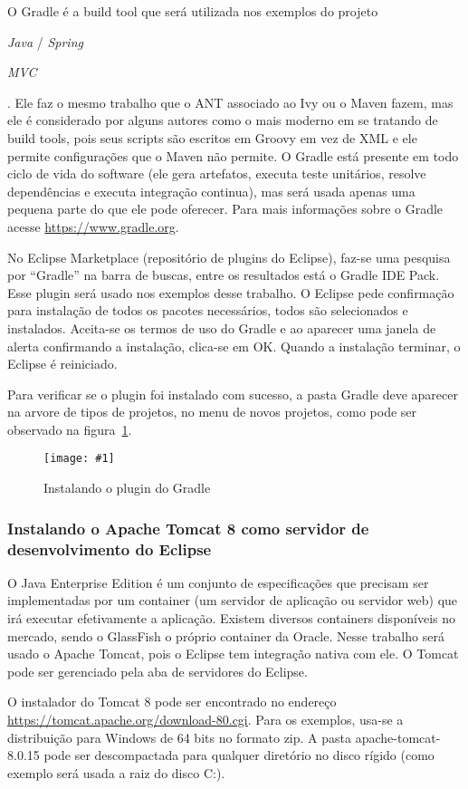 \documentclass[a4paper,12pt]{article}
\newcommand{\spring} {
\lang{Java}/\est{Spring} \sigla{MVC}
}
\newcommand{\figura}[3] {
	\begin{figure}[H]
		\centering
		\texttt{[image: \#1]}
		\caption{#2}
		\label{#3}
	\end{figure}
	\FloatBarrier
}
\newcommand{\est}[1] {
	\textit{#1}
}
\newcommand{\sigla}[1] {
	\textit{#1}
}
\newcommand{\lang}[1] {
	\textit{#1}
}
\begin{document}
O Gradle é a build tool que será utilizada nos exemplos do projeto \spring. Ele faz o mesmo trabalho que o ANT associado ao Ivy ou o Maven fazem, mas ele é considerado por alguns autores como o mais moderno em se tratando de build tools, pois seus scripts são escritos em Groovy em vez de XML e ele permite configurações que o Maven não permite. O Gradle está presente em todo ciclo de vida do software (ele gera artefatos, executa teste unitários, resolve dependências e executa integração continua), mas será usada apenas uma pequena parte do que ele pode oferecer. Para mais informações sobre o Gradle acesse \url{https://www.gradle.org}. 

No Eclipse Marketplace (repositório de plugins do Eclipse), faz-se uma pesquisa por “Gradle” na barra de buscas, entre os resultados está o Gradle IDE Pack. Esse plugin será usado nos exemplos desse trabalho. O Eclipse pede confirmação para instalação de todos os pacotes necessários, todos são selecionados e instalados. Aceita-se os termos de uso do Gradle e ao aparecer uma janela de alerta confirmando a instalação, clica-se em OK. Quando a instalação terminar, o Eclipse é reiniciado.

Para verificar se o plugin foi instalado com sucesso, a pasta Gradle deve aparecer na arvore de tipos de projetos, no menu de novos projetos, como pode ser observado na figura~\ref{fig:gradle1}.

\figura{plugin1.png}{Instalando o plugin do Gradle}{fig:gradle1}

\subsubsection{Instalando o Apache Tomcat 8 como servidor de desenvolvimento do Eclipse} 

O Java Enterprise Edition é um conjunto de especificações que precisam ser implementadas por um container (um servidor de aplicação ou servidor web) que irá executar efetivamente a aplicação. Existem diversos containers disponíveis no mercado, sendo o GlassFish o próprio container da Oracle. Nesse trabalho será usado o Apache Tomcat, pois o Eclipse tem integração nativa com ele. O Tomcat pode ser gerenciado pela aba de servidores do Eclipse.

O instalador do Tomcat 8 pode ser encontrado no endereço \url{https://tomcat.apache.org/download-80.cgi}. Para os exemplos, usa-se a distribuição para Windows de 64 bits no formato zip. A pasta apache-tomcat-8.0.15 pode ser descompactada para qualquer diretório no disco rígido (como exemplo será usada a raiz do disco C:).  
\end{document}
